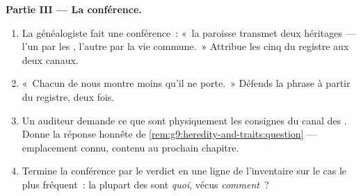 \begin{problem}
\medskip\noindent\textbf{Partie III --- La conférence.}
\begin{enumerate}[resume]
  \item La généalogiste fait une conférence~: «~la
        paroisse transmet deux héritages --- l'un par les
        , l'autre par la vie commune.~» Attribue
        les cinq  du registre aux deux canaux.
  \item «~Chacun de nous montre moins qu'il ne porte.~»
        Défends la phrase à partir du registre, deux fois.
  \item Un auditeur demande ce que sont physiquement les
        consignes du canal des . Donne la réponse
        honnête de \cref{rem:g9:heredity-and-traits:question}
        --- emplacement connu, contenu au prochain chapitre.
  \item Termine la conférence par le verdict en une ligne
        de l'inventaire sur le cas le plus fréquent~: la
        plupart des  sont \emph{quoi}, vécus
        \emph{comment}~?
\end{enumerate}
\end{problem}
